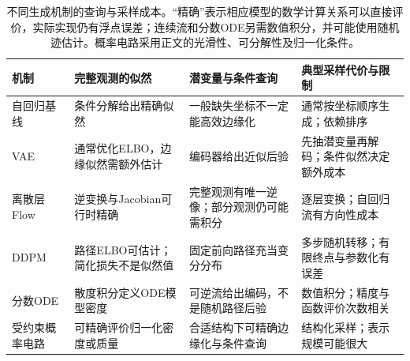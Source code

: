 \begin{table}[htbp]
  \centering
  \small
  \begin{tabularx}{\linewidth}{@{}lXXX@{}}
    \toprule
    机制 & 完整观测的似然 & 潜变量与条件查询 & 典型采样代价与限制 \\
    \midrule
    自回归基线
      & 条件分解给出精确似然
      & 一般缺失坐标不一定能高效边缘化
      & 通常按坐标顺序生成；依赖排序 \\
    VAE
      & 通常优化ELBO，边缘似然需额外估计
      & 编码器给出近似后验
      & 先抽潜变量再解码；条件似然决定额外成本 \\
    离散层Flow
      & 逆变换与Jacobian可行时精确
      & 完整观测有唯一逆像；部分观测仍可能需积分
      & 逐层变换；自回归流有方向性成本 \\
    DDPM
      & 路径ELBO可估计；简化损失不是似然值
      & 固定前向路径充当变分分布
      & 多步随机转移；有限终点与参数化有误差 \\
    分数ODE
      & 散度积分定义ODE模型密度
      & 可逆流给出编码，不是随机路径后验
      & 数值积分；精度与函数评价次数相关 \\
    受约束概率电路
      & 可精确评价归一化密度或质量
      & 合适结构下可精确边缘化与条件查询
      & 结构化采样；表示规模可能很大 \\
    \bottomrule
  \end{tabularx}
  \caption{不同生成机制的查询与采样成本。“精确”表示相应模型的数学计算关系可以直接评价，实际实现仍有浮点误差；连续流和分数ODE另需数值积分，并可能使用随机迹估计。概率电路采用正文的光滑性、可分解性及归一化条件。}
  \label{tab:pgm-generative-model-comparison}
\end{table}


